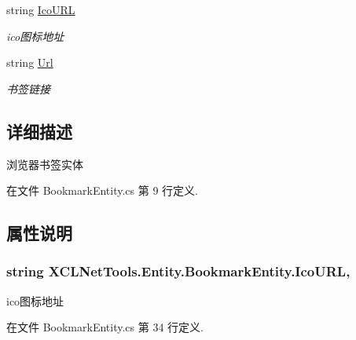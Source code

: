 \begin{DoxyCompactItemize}
string \hyperlink{class_x_c_l_net_tools_1_1_entity_1_1_bookmark_entity_af370dbfd32e8cde501e305c6999c077b}{Ico\-U\-R\-L}
\begin{DoxyCompactList}\small\item\em ico图标地址 \end{DoxyCompactList}\item 
string \hyperlink{class_x_c_l_net_tools_1_1_entity_1_1_bookmark_entity_a88ebfe2441fd5804a82f5eaee1ce3232}{Url}
\begin{DoxyCompactList}\small\item\em 书签链接 \end{DoxyCompactList}\end{DoxyCompactItemize}


\subsection{详细描述}
浏览器书签实体 



在文件 Bookmark\-Entity.\-cs 第 9 行定义.



\subsection{属性说明}
\hypertarget{class_x_c_l_net_tools_1_1_entity_1_1_bookmark_entity_af370dbfd32e8cde501e305c6999c077b}{
\subsubsection[{Ico\-U\-R\-L}]{\setlength{\rightskip}{0pt plus 5cm}string X\-C\-L\-Net\-Tools.\-Entity.\-Bookmark\-Entity.\-Ico\-U\-R\-L\hspace{0.3cm}{\ttfamily [get]}, {\ttfamily [set]}}}\label{class_x_c_l_net_tools_1_1_entity_1_1_bookmark_entity_af370dbfd32e8cde501e305c6999c077b}


ico图标地址 



在文件 Bookmark\-Entity.\-cs 第 34 行定义.

